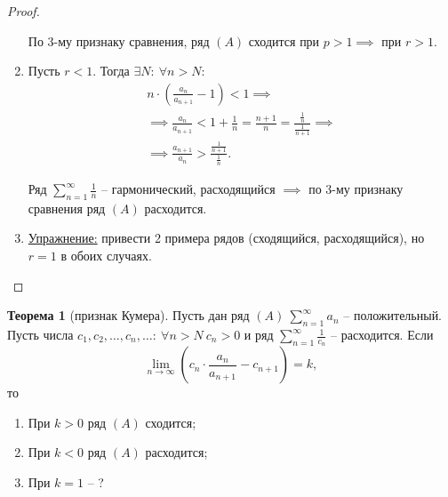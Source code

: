 \documentclass{report}
\theoremstyle{definition}
\newtheorem{theorem}{Теорема}[section]
\begin{document}
\begin{proof}
\begin{enumerate}
          По 3-му признаку сравнения, ряд $(A)$ сходится при $p > 1 \implies$ при $r > 1$.

    \item Пусть $r < 1$. Тогда $\exists N: \ \forall n > N$:
          \begin{multline*}
            n \cdot (\frac{a_n}{a_{n+1}} - 1) < 1 \implies \\
            \implies \frac{a_n}{a_{n+1}} < 1 + \frac{1}{n} = \frac{n+1}{n} = \frac{\frac{1}{n}}{\frac{1}{n+1}} \implies \\
            \implies \frac{a_{n+1}}{a_n} > \frac{\frac{1}{n+1}}{\frac{1}{n}}.
          \end{multline*}

          Ряд $\sum_{n=1}^{\infty}\frac{1}{n}$ -- гармонический, расходящийся $\implies$ по 3-му признаку сравнения ряд $(A)$ расходится.

    \item \underline{Упражнение:} привести 2 примера рядов (сходящийся, расходящийся), но $r=1$ в обоих случаях.
  \end{enumerate}
\end{proof}

\begin{theorem}[признак Кумера]
  Пусть дан ряд $(A) \ \sum_{n=1}^{\infty}a_n$ -- положительный. Пусть числа $c_1,c_2,\ldots,c_n,\ldots: \ \forall n > N \ c_n > 0$ и ряд $\sum_{n=1}^{\infty}\frac{1}{c_n}$ -- расходится. Если
  \begin{equation*}
    \underset{n\rightarrow\infty}{\lim}(c_n \cdot \frac{a_n}{a_{n+1}} - c_{n+1}) = k,
  \end{equation*}
  то
  \begin{enumerate}
    \item При $k > 0$ ряд $(A)$ сходится;
    \item При $k < 0$ ряд $(A)$ расходится;
    \item При $k = 1$ -- ?
  \end{enumerate}
\end{theorem}
\end{document}
